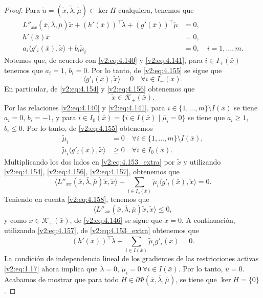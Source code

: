 \begin{proof}
    Para $\tilde{u} = (\tilde{x}, \tilde{\lambda}, \tilde{\mu}) \in \ker H$ cualquiera, tenemos que
    \begin{align}
        L''_{xx}(\bar{x}, \bar{\lambda}, \bar{\mu})\tilde{x} + (h'(\bar{x}))^\top \tilde{\lambda} + (g'(\bar{x}))^\top \tilde{\mu} &= 0, \label{v2:eq:4.153_extra} \\
        h'(\bar{x})\tilde{x} &= 0, \label{v2:eq:4.154} \\
        a_i \langle g'_i(\bar{x}), \tilde{x} \rangle + b_i \tilde{\mu}_i &= 0, \quad i = 1, \dots, m. \label{v2:eq:4.155}
    \end{align}
    Notemos que, de acuerdo con \eqref{v2:eq:4.140} y \eqref{v2:eq:4.141}, para $i \in I_+(\bar{x})$ tenemos que $a_i = 1$, $b_i = 0$. Por lo tanto, de \eqref{v2:eq:4.155} se sigue que
    \begin{equation}
        \langle g'_i(\bar{x}), \tilde{x} \rangle = 0 \quad \forall i \in I_+(\bar{x}). \label{v2:eq:4.156}
    \end{equation}
    En particular, de \eqref{v2:eq:4.154} y \eqref{v2:eq:4.156} obtenemos que
    \[
        \tilde{x} \in \mathcal{K}_+(\bar{x}).
    \]
    Por las relaciones \eqref{v2:eq:4.140} y \eqref{v2:eq:4.141}, para $i \in \{1, \dots, m\} \setminus I(\bar{x})$ se tiene $a_i = 0$, $b_i = -1$, y para $i \in I_0(\bar{x}) = \{i \in I(\bar{x}) \mid \bar{\mu}_i = 0\}$ se tiene que $a_i \ge 1$, $b_i \le 0$. Por lo tanto, de \eqref{v2:eq:4.155} obtenemos
    \begin{align}
        \tilde{\mu}_i &= 0 \quad \forall i \in \{1, \dots, m\} \setminus I(\bar{x}), \label{v2:eq:4.157} \\
        \tilde{\mu}_i \langle g'_i(\bar{x}), \tilde{x} \rangle &\ge 0 \quad \forall i \in I_0(\bar{x}). \label{v2:eq:4.158}
    \end{align}
    Multiplicando los dos lados en \eqref{v2:eq:4.153_extra} por $\tilde{x}$ y utilizando \eqref{v2:eq:4.154}, \eqref{v2:eq:4.156}, \eqref{v2:eq:4.157}, obtenemos que
    \[
        \langle L''_{xx}(\bar{x}, \bar{\lambda}, \bar{\mu})\tilde{x}, \tilde{x} \rangle + \sum_{i \in I_0(\bar{x})} \tilde{\mu}_i \langle g'_i(\bar{x}), \tilde{x} \rangle = 0.
    \]
    Teniendo en cuenta \eqref{v2:eq:4.158}, tenemos que
    \[
        \langle L''_{xx}(\bar{x}, \bar{\lambda}, \bar{\mu})\tilde{x}, \tilde{x} \rangle \le 0,
    \]
    y como $\tilde{x} \in \mathcal{K}_+(\bar{x})$, de \eqref{v2:eq:4.146} se sigue que $\tilde{x} = 0$.
    A continuación, utilizando \eqref{v2:eq:4.157}, de \eqref{v2:eq:4.153_extra} obtenemos que
    \[
        (h'(\bar{x}))^\top \tilde{\lambda} + \sum_{i \in I(\bar{x})} \tilde{\mu}_i g'_i(\bar{x}) = 0.
    \]
    La condición de independencia lineal de los gradientes de las restricciones activas \eqref{v2:eq:1.17} ahora implica que $\tilde{\lambda} = 0$, $\tilde{\mu}_i = 0 \ \forall i \in I(\bar{x})$. Por lo tanto, $\tilde{u} = 0$.
    Acabamos de mostrar que para todo $H \in \partial \Phi(\bar{x}, \bar{\lambda}, \bar{\mu})$, se tiene que $\ker H = \{0\}$.
\end{proof}

